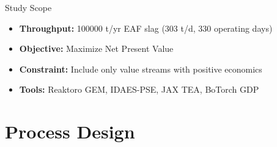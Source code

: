 \documentclass[aspectratio=169]{beamer}
\begin{document}
\begin{frame}{Study Scope}
\begin{itemize}
  \item \textbf{Throughput:} \num{100000} t/yr EAF slag (303 t/d, 330 operating days)
  \item \textbf{Objective:} Maximize Net Present Value
  \item \textbf{Constraint:} Include only value streams with positive economics
  \item \textbf{Tools:} Reaktoro GEM, IDAES-PSE, JAX TEA, BoTorch GDP
\end{itemize}
\end{frame}

\section{Process Design}
\end{document}
